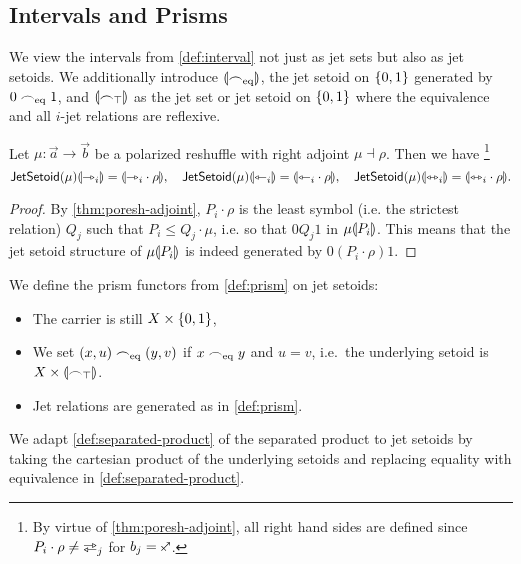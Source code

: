 \documentclass[a4paper]{memoir}
\begin{document}
\subsection{Intervals and Prisms}
\begin{definition} \label{def:jetsetoid-interval}
	We view the intervals from \cref{def:interval} not just as jet sets but also as jet setoids. We additionally introduce ${\llparenthesis {\frown}_{{\mathrm{eq}}} \rrparenthesis}$, the jet setoid on $\mathopen{}\left\{ 0, 1 \right\}\mathclose{}$ generated by $0 \frown_{{\mathrm{eq}}} 1$, and ${\llparenthesis {\frown}_\top \rrparenthesis}$ as the jet set or jet setoid on $\mathopen{}\left\{ 0, 1 \right\}\mathclose{}$ where the equivalence and all $i$-jet relations are reflexive.
\end{definition}
\begin{proposition} \label{thm:poresh-jetsetoid-intervals}
	Let $\mu : \vec a \to \vec b$ be a polarized reshuffle with right adjoint $\mu \dashv \rho$. Then we have%
	\footnote{By virtue of \cref{thm:poresh-adjoint}, all right hand sides are defined since $P_i \cdot \rho \neq \infrajetsym_j$ for $b_j = \ypolar$.}
	\begin{equation}
		\mathsf{JetSetoid}(\mu) {\llparenthesis {\rightarrowtriangle}_i \rrparenthesis} = {\llparenthesis {\rightarrowtriangle}_i \cdot \rho \rrparenthesis}, \quad
		\mathsf{JetSetoid}(\mu) {\llparenthesis {\leftarrowtriangle}_i \rrparenthesis} = {\llparenthesis {\leftarrowtriangle}_i \cdot \rho \rrparenthesis}, \quad
		\mathsf{JetSetoid}(\mu) {\llparenthesis {\leftrightarrowtriangle}_i \rrparenthesis} = {\llparenthesis {\leftrightarrowtriangle}_i \cdot \rho \rrparenthesis}.
		\label{eq:poresh-jetsetoid-intervals}
	\end{equation}
\end{proposition}
\begin{proof}
	By \cref{thm:poresh-adjoint}, $P_i \cdot \rho$ is the least symbol (i.e. the strictest relation) $Q_j$ such that $P_i \leq Q_j \cdot \mu$, i.e. so that $0 \mathrel{Q_j} 1$ in $\mu {\llparenthesis P_i \rrparenthesis}$.
	This means that the jet setoid structure of $\mu {\llparenthesis P_i \rrparenthesis}$ is indeed generated by $0 \mathrel{(P_i \cdot \rho)} 1$.
\end{proof}
\begin{definition} \label{def:jetsetoid-prism}
	We define the prism functors from \cref{def:prism} on jet setoids:
	\begin{itemize}
		\item The carrier is still $X \times \mathopen{}\left\{ 0, 1 \right\}\mathclose{}$,
		\item We set $(x, u) \frown_{{\mathrm{eq}}} (y, v)$ if $x \frown_{{\mathrm{eq}}} y$ and $u = v$, i.e.\ the underlying setoid is $X \times {\llparenthesis {\frown}_\top\rrparenthesis}$.
		\item Jet relations are generated as in \cref{def:prism}.
	\end{itemize}
\end{definition}
\begin{definition} \label{def:jetsetoid-separated-product}
	We adapt \cref{def:separated-product} of the separated product to jet setoids by taking the cartesian product of the underlying setoids and replacing equality with equivalence in \cref{def:separated-product}.
\end{definition}
\end{document}
